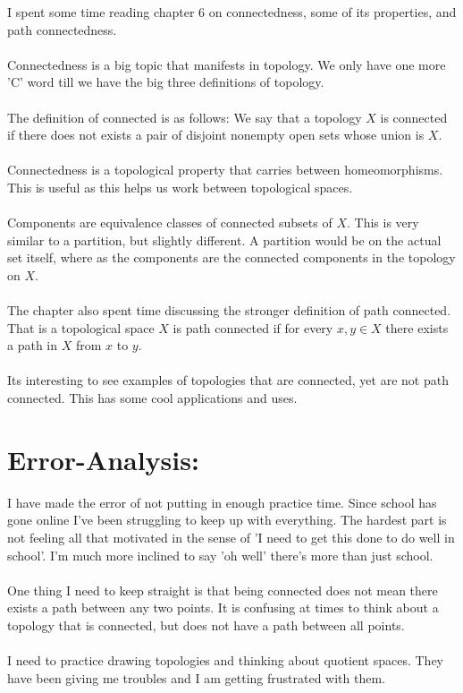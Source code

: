 \documentclass[11pt]{article}
\begin{document}
I spent some time reading chapter 6 on connectedness, some of its properties, and path connectedness. \\
\\
Connectedness is a big topic that manifests in topology. We only have one more 'C' word till we have the big three definitions of topology.\\
\\
The definition of connected is as follows: We say that a topology $ X $ is connected if there does not exists a pair of disjoint nonempty open sets whose union is $ X $.\\
\\
Connectedness is a topological property that carries between homeomorphisms. This is useful as this helps us work between topological spaces.\\
\\
Components are equivalence classes of connected subsets of $ X $. This is very similar to a partition, but slightly different. A partition would be on the actual set itself, where as the components are the connected components in the topology on $ X $.\\
\\
The chapter also spent time discussing the stronger definition of path connected. That is a topological space $ X $ is path connected if for every $ x,y \in X $ there exists a path in $ X $ from $ x $ to $ y $.\\
\\
Its interesting to see examples of topologies that are connected, yet are not path connected. This has some cool applications and uses.
\section*{Error-Analysis:}
I have made the error of not putting in enough practice time. Since school has gone online I've been struggling to keep up with everything. The hardest part is not feeling all that motivated in the sense of 'I  need to get this done to do well in school'. I'm much more inclined to say 'oh well' there's more than just school.\\
\\
One thing I need to keep straight is that being connected does not mean there exists a path between any two points. It is confusing at times to think about a topology that is connected, but does not have a path between all points.\\ 
\\
I need to practice drawing topologies and thinking about quotient spaces. They have been giving me troubles and I am getting frustrated with them.
\end{document}
